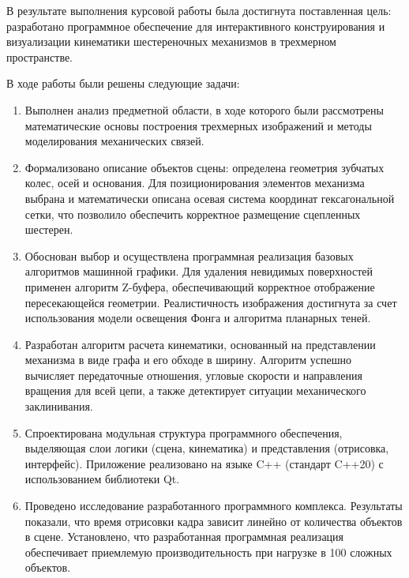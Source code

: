 
В результате выполнения курсовой работы была достигнута поставленная цель: разработано программное обеспечение для интерактивного конструирования и визуализации кинематики шестереночных механизмов в трехмерном пространстве.

В ходе работы были решены следующие задачи:
\begin{enumerate}
	\item Выполнен анализ предметной области, в ходе которого были рассмотрены математические основы построения трехмерных изображений и методы моделирования механических связей.
	\item Формализовано описание объектов сцены: определена геометрия зубчатых колес, осей и основания. Для позиционирования элементов механизма выбрана и математически описана осевая система координат гексагональной сетки, что позволило обеспечить корректное размещение сцепленных шестерен.
	\item Обоснован выбор и осуществлена программная реализация базовых алгоритмов машинной графики. Для удаления невидимых поверхностей применен алгоритм Z-буфера, обеспечивающий корректное отображение пересекающейся геометрии. Реалистичность изображения достигнута за счет использования модели освещения Фонга и алгоритма планарных теней.
	\item Разработан алгоритм расчета кинематики, основанный на представлении механизма в виде графа и его обходе в ширину. Алгоритм успешно вычисляет передаточные отношения, угловые скорости и направления вращения для всей цепи, а также детектирует ситуации механического заклинивания.
	\item Спроектирована модульная структура программного обеспечения, выделяющая слои логики (сцена, кинематика) и представления (отрисовка, интерфейс). Приложение реализовано на языке C++ (стандарт C++20) с использованием библиотеки Qt.
	\item Проведено исследование разработанного программного комплекса. Результаты показали, что время отрисовки кадра зависит линейно от количества объектов в сцене. Установлено, что разработанная программная реализация обеспечивает приемлемую производительность при нагрузке в 100 сложных объектов.
\end{enumerate}

